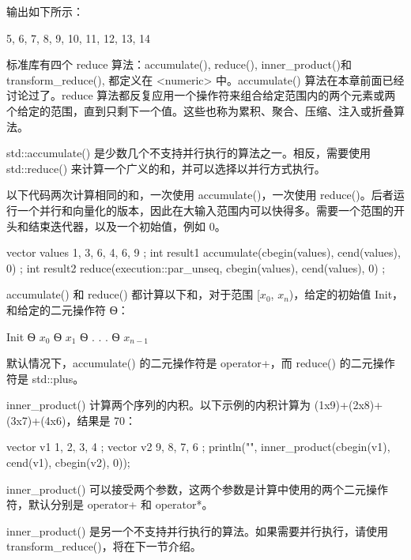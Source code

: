 输出如下所示：

\begin{shell}
5, 6, 7, 8, 9, 10, 11, 12, 13, 14
\end{shell}


标准库有四个 reduce 算法：accumulate(), reduce(), inner\_product()和 transform\_reduce(), 都定义在 <numeric> 中。accumulate() 算法在本章前面已经讨论过了。reduce 算法都反复应用一个操作符来组合给定范围内的两个元素或两个给定的范围，直到只剩下一个值。这些也称为累积、聚合、压缩、注入或折叠算法。


std::accumulate() 是少数几个不支持并行执行的算法之一。相反，需要使用 std::reduce() 来计算一个广义的和，并可以选择以并行方式执行。

以下代码两次计算相同的和，一次使用 accumulate()，一次使用 reduce()。后者运行一个并行和向量化的版本，因此在大输入范围内可以快得多。需要一个范围的开头和结束迭代器，以及一个初始值，例如 0。

\begin{cpp}
vector values { 1, 3, 6, 4, 6, 9 };
int result1 { accumulate(cbegin(values), cend(values), 0) };
int result2 { reduce(execution::par_unseq, cbegin(values), cend(values), 0) };
\end{cpp}

accumulate() 和 reduce() 都计算以下和，对于范围 [$x_0$, $x_{n}$)，给定的初始值 Init，和给定的二元操作符 Ѳ：

Init Ѳ $x_0$ Ѳ $x_1$ Ѳ . . . Ѳ $x_{n−1}$

默认情况下，accumulate() 的二元操作符是 operator+，而 reduce() 的二元操作符是 std::plus。


inner\_product() 计算两个序列的内积。以下示例的内积计算为 (1x9)+(2x8)+(3x7)+(4x6)，结果是 70：

\begin{cpp}
vector v1 { 1, 2, 3, 4 };
vector v2 { 9, 8, 7, 6 };
println("{}", inner_product(cbegin(v1), cend(v1), cbegin(v2), 0));
\end{cpp}

inner\_product() 可以接受两个参数，这两个参数是计算中使用的两个二元操作符，默认分别是 operator+ 和 operator*。

inner\_product() 是另一个不支持并行执行的算法。如果需要并行执行，请使用 transform\_reduce()，将在下一节介绍。


